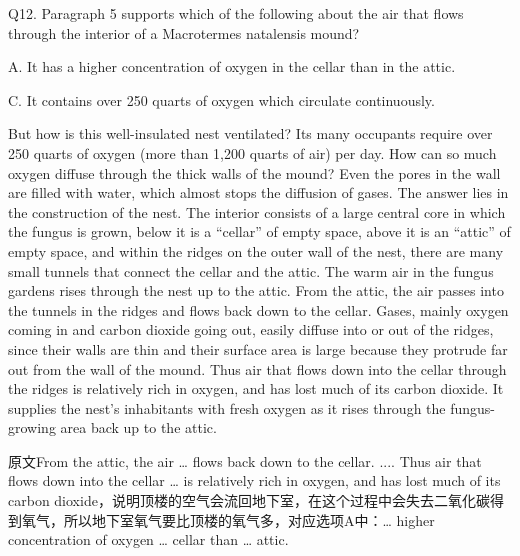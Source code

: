 \begin{blk}
    \begin{qst}
        Q12. Paragraph 5 supports which of the following about the air that flows through the interior of a Macrotermes natalensis mound?
    \end{qst}

    \begin{chc}
        A. It has a higher concentration of oxygen in the cellar than in the attic.

        C. It contains over 250 quarts of oxygen which circulate continuously.
    \end{chc}

    \begin{psgq}
        But how is this well-insulated nest ventilated? Its many occupants require over 250 quarts of oxygen (more than 1,200 quarts of air) per day. How can so much oxygen diffuse through the thick walls of the mound? Even the pores in the wall are filled with water, which almost stops the diffusion of gases. The answer lies in the construction of the nest. The interior consists of a large central core in which the fungus is grown, below it is a “cellar” of empty space, above it is an “attic” of empty space, and within the ridges on the outer wall of the nest, there are many small tunnels that connect the cellar and the attic. The warm air in the fungus gardens rises through the nest up to the attic. From the attic, the air passes into the tunnels in the ridges and flows back down to the cellar. Gases, mainly oxygen coming in and carbon dioxide going out, easily diffuse into or out of the ridges, since their walls are thin and their surface area is large because they protrude far out from the wall of the mound. Thus air that flows down into the cellar through the ridges is relatively rich in oxygen, and has lost much of its carbon dioxide. It supplies the nest’s inhabitants with fresh oxygen as it rises through the fungus-growing area back up to the attic.
    \end{psgq}

    \begin{nlz}
        原文From the attic, the air … flows back down to the cellar. .... Thus air that flows down into the cellar … is relatively rich in oxygen, and has lost much of its carbon dioxide，说明顶楼的空气会流回地下室，在这个过程中会失去二氧化碳得到氧气，所以地下室氧气要比顶楼的氧气多，对应选项A中：… higher concentration of oxygen … cellar than … attic.
    \end{nlz}


\end{blk}
